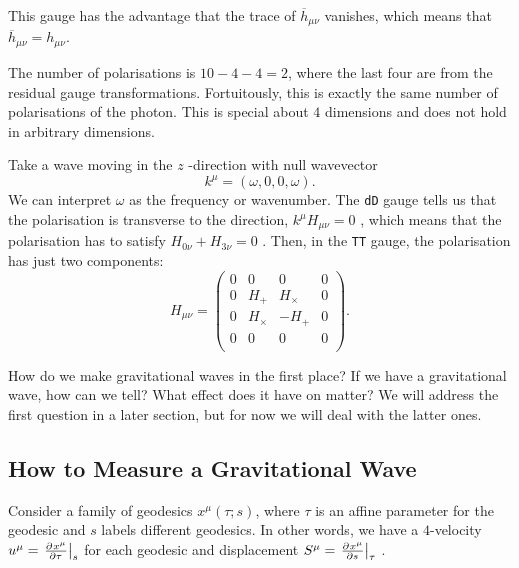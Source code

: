 
This gauge has the advantage that the trace of $\overline{h}_{\mu\nu}$ vanishes, which means that $\overline{h}_{\mu\nu} = h_{\mu\nu}$.

The number of polarisations is $10 - 4 - 4 = 2$, where the last four are from the residual gauge transformations.
Fortuitously, this is exactly the same number of polarisations of the photon.
This is special about $4$ dimensions and does not hold in arbitrary dimensions.

\begin{example}[]
  Take a wave moving in the $z$ -direction with null wavevector
  \begin{equation}
    k^{\mu} = (\omega, 0, 0, \omega).
  \end{equation}
  We can interpret $\omega$  as the frequency or wavenumber.
  The \texttt{dD} gauge tells us that the polarisation is transverse to the direction, $k^{\mu} H_{\mu\nu} = 0$ , which means that the polarisation has to satisfy $H_{0\nu} + H_{3 \nu} = 0$ . Then, in the \texttt{TT} gauge, the polarisation has just two components:
  \begin{equation}
    H_{\mu\nu} = 
    \begin{pmatrix}
     0 & 0 & 0 & 0 \\
     0 & H_+ & H_\times & 0 \\
     0 & H_\times & -H_+ & 0 \\
     0 & 0 & 0 & 0 \\
    \end{pmatrix}.
  \end{equation}
\end{example}

How do we make gravitational waves in the first place? If we have a gravitational wave, how can we tell? What effect does it have on matter?
We will address the first question in a later section, but for now we will deal with the latter ones.

\subsection{How to Measure a Gravitational Wave}%
\label{sub:how_to_measure_a_gravitational_wave}

Consider a family of geodesics $x^{\mu} (\tau; s)$,  where $\tau$  is an affine parameter for the geodesic and $s$  labels different geodesics.
In other words, we have a $4$-velocity $u^{\mu} = \left.\pdv[]{x^{\mu}}{\tau}\right\rvert_{s}$ for each geodesic and displacement $S^{\mu} = \left.\pdv[]{x^{\mu}}{s}\right\rvert_{\tau}$ .

